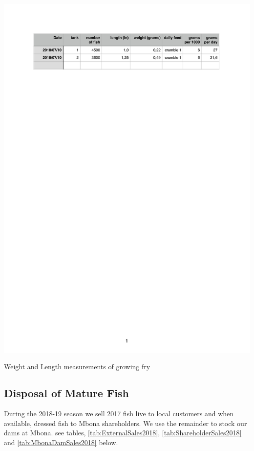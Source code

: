 \begin{table}[H]
  \centering
  \includegraphics[scale = 0.9]{tables/TablesFryGrowth.pdf}
   \caption{Weight and Length measurements of growing fry}
   \label{tab:FryGrowth}
\end{table}

\subsection{Disposal of Mature Fish}

During the 2018-19 season we sell 2017 fish live to local customers and 
when available, dressed fish to Mbona shareholders. We use the remainder
to stock our dams at Mbona. see tables, \ref{tab:ExternalSales2018}, 
\ref{tab:ShareholderSales2018} and \ref{tab:MbonaDamSales2018} below.

